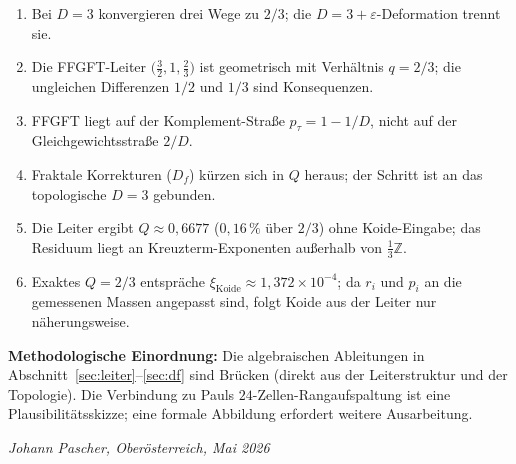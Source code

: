 \begin{enumerate}
  \item Bei \(D = 3\) konvergieren drei Wege zu \(2/3\);
        die \(D = 3+\varepsilon\)-Deformation trennt sie.
  \item Die FFGFT-Leiter
        \(\bigl(\tfrac{3}{2}, 1, \tfrac{2}{3}\bigr)\)
        ist geometrisch mit Verhältnis \(q = 2/3\);
        die ungleichen Differenzen \(1/2\) und \(1/3\) sind Konsequenzen.
  \item FFGFT liegt auf der Komplement-Straße
        \(p_\tau = 1 - 1/D\), nicht auf der Gleichgewichtsstraße \(2/D\).
  \item Fraktale Korrekturen (\(D_f\)) kürzen sich in \(Q\) heraus;
        der Schritt ist an das topologische \(D = 3\) gebunden.
  \item Die Leiter ergibt \(Q \approx 0{,}6677\)
        (\(0{,}16\,\%\) über \(2/3\)) ohne Koide-Eingabe;
        das Residuum liegt an Kreuzterm-Exponenten außerhalb von
        \(\tfrac{1}{3}\mathbb{Z}\).
  \item Exaktes \(Q = 2/3\) entspräche
        \(\xi_{\text{Koide}} \approx 1{,}372\times10^{-4}\);
        da \(r_i\) und \(p_i\) an die gemessenen Massen angepasst sind,
        folgt Koide aus der Leiter nur näherungsweise.
\end{enumerate}

\bigskip
\noindent
\textbf{Methodologische Einordnung:}
Die algebraischen Ableitungen in Abschnitt~\ref{sec:leiter}--\ref{sec:df}
sind Brücken (direkt aus der Leiterstruktur und der Topologie).
Die Verbindung zu Pauls \(24\)-Zellen-Rangaufspaltung ist eine
Plausibilitätsskizze; eine formale Abbildung erfordert weitere Ausarbeitung.

\bigskip
\begin{flushright}
\textit{Johann Pascher, Oberösterreich, Mai 2026}
\end{flushright}

